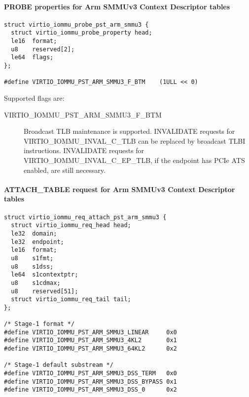 \paragraph{PROBE properties for Arm SMMUv3 Context Descriptor tables}\label{sec:Device Types / IOMMU Device / Table Formats / Arm SMMUv3 Context Descriptor / PROBE}

\begin{lstlisting}
struct virtio_iommu_probe_pst_arm_smmu3 {
  struct virtio_iommu_probe_property head;
  le16  format;
  u8    reserved[2];
  le64  flags;
};

#define VIRTIO_IOMMU_PST_ARM_SMMU3_F_BTM    (1ULL << 0)
\end{lstlisting}

Supported flags are:
\begin{description}
  \item[VIRTIO_IOMMU_PST_ARM_SMMU3_F_BTM] Broadcast TLB
    maintenance is supported. INVALIDATE requests for
     VIRTIO_IOMMU_INVAL_C_TLB can be replaced by
    broadcast TLBI instructions. INVALIDATE requests for
     VIRTIO_IOMMU_INVAL_C_EP_TLB, if the endpoint
    has PCIe ATS enabled, are still necessary.
\end{description}

\paragraph{ATTACH_TABLE request for Arm SMMUv3 Context Descriptor tables}\label{sec:Device Types / IOMMU Device / Table Formats / Arm SMMUv3 Context Descriptor / ATTACH_TABLE}

\begin{lstlisting}
struct virtio_iommu_req_attach_pst_arm_smmu3 {
  struct virtio_iommu_req_head head;
  le32  domain;
  le32  endpoint;
  le16  format;
  u8    s1fmt;
  u8    s1dss;
  le64  s1contextptr;
  u8    s1cdmax;
  u8    reserved[51];
  struct virtio_iommu_req_tail tail;
};

/* Stage-1 format */
#define VIRTIO_IOMMU_PST_ARM_SMMU3_LINEAR     0x0
#define VIRTIO_IOMMU_PST_ARM_SMMU3_4KL2       0x1
#define VIRTIO_IOMMU_PST_ARM_SMMU3_64KL2      0x2

/* Stage-1 default substream */
#define VIRTIO_IOMMU_PST_ARM_SMMU3_DSS_TERM   0x0
#define VIRTIO_IOMMU_PST_ARM_SMMU3_DSS_BYPASS 0x1
#define VIRTIO_IOMMU_PST_ARM_SMMU3_DSS_0      0x2
\end{lstlisting}

